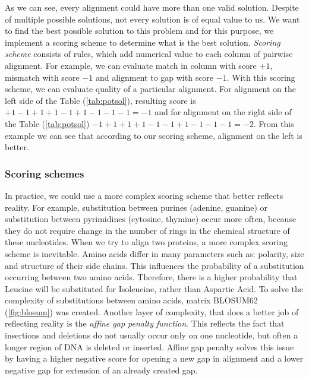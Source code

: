 As we can see, every alignment could have more than one valid solution.
Despite of multiple possible solutions, not every solution is of equal value to us.
We want to find the best possible solution to this problem and for this purpose, we implement a scoring scheme to determine what is the best solution.
\emph{Scoring scheme} consists of rules, which add numerical value to each column of pairwise alignment.
For example, we can evaluate match in column with score $+1$, mismatch with score $-1$ and alignment to gap with score $-1$.
With this scoring scheme, we can evaluate quality of a particular alignment.
For alignment on the left side of the Table (\ref{tab:potsol}), resulting score is $+1-1+1+1-1+1-1-1-1 = -1$ and for alignment on the right side of the Table (\ref{tab:potsol}) $-1+1+1+1-1-1+1-1-1-1 = -2$.
From this example we can see that according to our scoring scheme, alignment on the left is better.

\subsubsection{Scoring schemes}
In practice, we could use a more complex scoring scheme that better reflects reality.
For example, substitution between purines (adenine, guanine) or substitution between pyrimidines (cytosine, thymine) occur more often, because they do not require change in the number of rings in the chemical structure of these nucleotides.
When we try to align two proteins, a more complex scoring scheme is inevitable.
Amino acids differ in many parameters such as: polarity, size and structure of their side chains.
This influences the probability of a substitution occurring between two amino acids.
Therefore, there is a higher probability that Leucine will be substituted for Isoleucine, rather than Aspartic Acid.
To solve the complexity of substitutions between amino acids, matrix BLOSUM62 (\ref{fig:blosum}) was created.
Another layer of complexity, that does a better job of reflecting reality is the \emph{affine gap penalty function}.
This reflects the fact that insertions and deletions do not usually occur only on one nucleotide, but often a longer region of DNA is deleted or inserted.
Affine gap penalty solves this issue by having a higher negative score for opening a new gap in alignment and a lower negative gap for extension of an already created gap.

